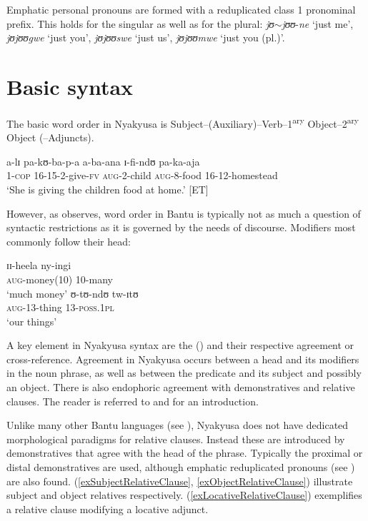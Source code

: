 \newpage
\noindent Emphatic personal pronouns are formed with a reduplicated class 1 pronominal prefix. This holds for the singular as well as for the plural: \textit{jʊ}$\sim$\textit{jʊʊ}-\textit{ne} `just me', \textit{jʊjʊʊgwe} `just you', \textit{jʊjʊʊswe} `just us', \textit{jʊjʊʊmwe} `just you (pl.)'. 

\section{Basic syntax}
The basic word order in Nyakyusa is Subject--(Auxiliary)--Verb--1\textsuperscript{ary} Object--2\textsuperscript{ary} Object (--Adjuncts).
\begin{exe}
	\ex \gll a-lɪ pa-kʊ-ba-p-a a-ba-ana ɪ-fi-ndʊ pa-ka-aja\\
	1-\textsc{cop} 16-15-2-give-\textsc{fv} \textsc{aug}-2-child \textsc{aug}-8-food 16-12-homestead\\
	\glt `She is giving the children food at home.' [ET]
\end{exe}  

However, as \citet{BearthT2003} observes, word order in Bantu is typically not as much a question of syntactic restrictions as it is governed by the needs of discourse. Modifiers most commonly follow their head:

\begin{exe}
	\ex \gll ɪɪ-heela ny-ingi\\
	\textsc{aug}-money(10) 10-many\\
	\glt `much money'
	\ex \gll ʊ-tʊ-ndʊ tw-ɪtʊ\\
	\textsc{aug}-13-thing 13-\textsc{poss.1pl}\\
	\glt `our things'
\end{exe}

A key element in Nyakyusa syntax are the  () and their respective agreement or cross-reference. Agreement in Nyakyusa occurs between a head and its modifiers in the noun phrase, as well as between the predicate and its subject and possibly an object. There is also endophoric agreement with demonstratives and relative clauses. The reader is referred to \citet{KatambaF2003} and \citet{BearthT2003} for an introduction.

\label{RelativeClausss} 
Unlike many other Bantu languages (see \citealt[ch. 3.3]{GueldemannT1996}), Nyakyusa does not have dedicated morphological paradigms for relative clauses. Instead these are introduced by demonstratives that agree with the head of the phrase. Typically the proximal or distal demonstratives are used, although emphatic reduplicated pronouns (see ) are also found. (\ref{exSubjectRelativeClause}, \ref{exObjectRelativeClause}) illustrate subject and object relatives respectively. (\ref{exLocativeRelativeClause}) exemplifies a relative clause modifying a locative adjunct.

